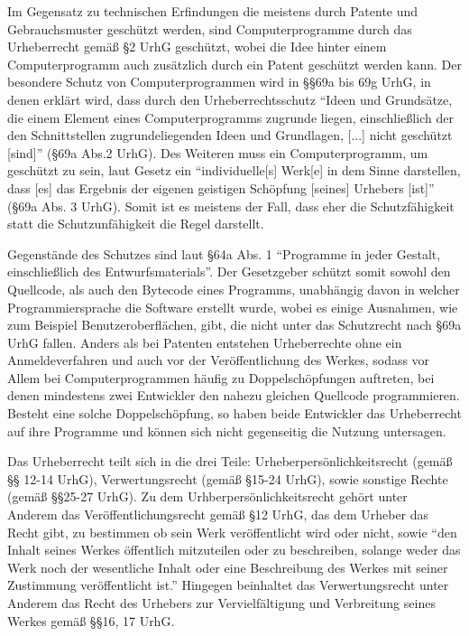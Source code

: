 Im Gegensatz zu technischen Erfindungen die meistens durch Patente und Gebrauchsmuster geschützt werden, sind Computerprogramme durch das Urheberrecht gemäß §2 UrhG geschützt,
wobei die Idee hinter einem Computerprogramm auch zusätzlich durch ein Patent geschützt werden kann. Der besondere Schutz von Computerprogrammen wird in §§69a bis 69g UrhG, in denen erklärt wird,
dass durch den Urheberrechtsschutz “Ideen und Grundsätze, die einem Element eines Computerprogramms zugrunde liegen, einschließlich der den Schnittstellen zugrundeliegenden Ideen und Grundlagen,
[...] nicht geschützt [sind]” (§69a Abs.2 UrhG).  Des Weiteren muss ein Computerprogramm, um geschützt zu sein, laut Gesetz ein “individuelle[s] Werk[e] in dem Sinne darstellen,
dass [es] das Ergebnis der eigenen geistigen Schöpfung [seines] Urhebers [ist]” (§69a Abs. 3 UrhG). Somit ist es meistens der Fall, dass eher die Schutzfähigkeit statt die Schutzunfähigkeit die Regel darstellt.

Gegenstände des Schutzes sind laut §64a Abs. 1 “Programme in jeder Gestalt, einschließlich des Entwurfsmaterials”. Der Gesetzgeber schützt somit sowohl den Quellcode,
als auch den Bytecode eines Programms, unabhängig davon in welcher Programmiersprache die Software erstellt wurde, wobei es einige Ausnahmen, wie zum Beispiel Benutzeroberflächen, gibt,
die nicht unter das Schutzrecht nach §69a UrhG fallen. Anders als bei Patenten entstehen Urheberrechte ohne ein Anmeldeverfahren und auch vor der Veröffentlichung des Werkes,
sodass vor Allem bei Computerprogrammen häufig zu Doppelschöpfungen auftreten, bei denen mindestens zwei Entwickler den nahezu gleichen Quellcode programmieren.
Besteht eine solche Doppelschöpfung, so haben beide Entwickler das Urheberrecht auf ihre Programme und können sich nicht gegenseitig die Nutzung untersagen. 

Das Urheberrecht teilt sich in die drei Teile: Urheberpersönlichkeitsrecht (gemäß §§ 12-14 UrhG), Verwertungsrecht (gemäß §15-24 UrhG), sowie sonstige Rechte (gemäß §§25-27 UrhG).
Zu dem Urhberpersönlichkeitsrecht gehört unter Anderem das Veröffentlichungsrecht gemäß §12 UrhG, das dem Urheber das Recht gibt, zu bestimmen ob sein Werk veröffentlicht wird oder nicht,
sowie “den Inhalt seines Werkes öffentlich mitzuteilen oder zu beschreiben, solange weder das Werk noch der wesentliche Inhalt oder eine Beschreibung des Werkes mit seiner
Zustimmung veröffentlicht ist.” Hingegen beinhaltet das Verwertungsrecht unter Anderem das Recht des Urhebers zur Vervielfältigung und Verbreitung seines Werkes gemäß §§16, 17 UrhG.


